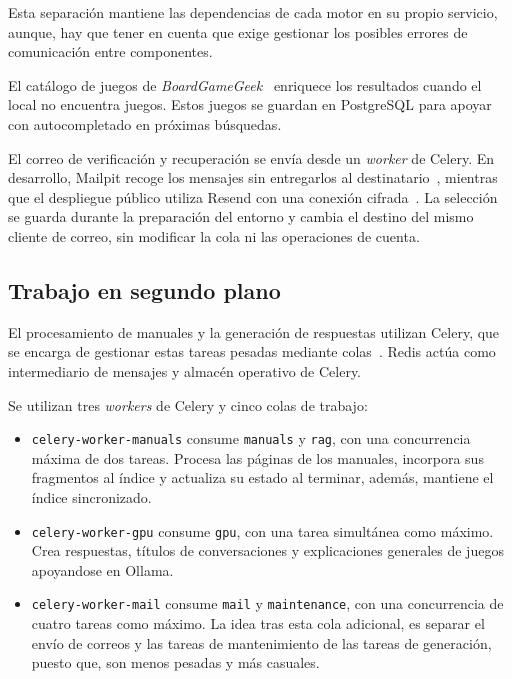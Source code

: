 Esta separación mantiene las dependencias de cada motor en su propio
servicio, aunque, hay que tener en cuenta que exige gestionar los posibles
errores de comunicación entre componentes.

El catálogo de juegos de \textit{BoardGameGeek}~\cite{boardgamegeek} enriquece los resultados cuando el
local no encuentra juegos. Estos juegos se guardan en PostgreSQL para apoyar con
autocompletado en próximas búsquedas.

El correo de verificación y recuperación se envía desde un
\textit{worker} de Celery. En desarrollo, Mailpit recoge los mensajes sin
entregarlos al destinatario~\cite{mailpit}, mientras que el despliegue público
utiliza Resend con una conexión cifrada~\cite{resend_smtp}. La selección se
guarda durante la preparación del entorno y cambia el destino del mismo
cliente de correo, sin modificar la cola ni las operaciones de cuenta.


\FloatBarrier
\subsection{Trabajo en segundo plano}

El procesamiento de manuales y la generación de respuestas utilizan Celery,
que se encarga de gestionar estas tareas pesadas mediante colas~\cite{celery_introduction}.
Redis actúa como intermediario de mensajes y almacén operativo de Celery.

Se utilizan tres \textit{workers} de Celery y cinco colas de trabajo:

\begin{itemize}
    \item \texttt{celery-worker-manuals} consume \texttt{manuals} y
    \texttt{rag}, con una concurrencia máxima de dos tareas. Procesa las
    páginas de los manuales, incorpora sus fragmentos al índice y actualiza
    su estado al terminar, además, mantiene el índice sincronizado.
    \item \texttt{celery-worker-gpu} consume \texttt{gpu}, con una tarea simultánea
    como máximo.
    Crea respuestas, títulos de conversaciones y explicaciones generales de juegos
    apoyandose en Ollama.
    \item \texttt{celery-worker-mail} consume \texttt{mail} y
    \texttt{maintenance}, con una concurrencia de cuatro tareas como máximo. La idea tras esta cola adicional, es separar
    el envío de correos y las tareas de mantenimiento de las tareas de
    generación, puesto que, son menos pesadas y más casuales.
\end{itemize}

